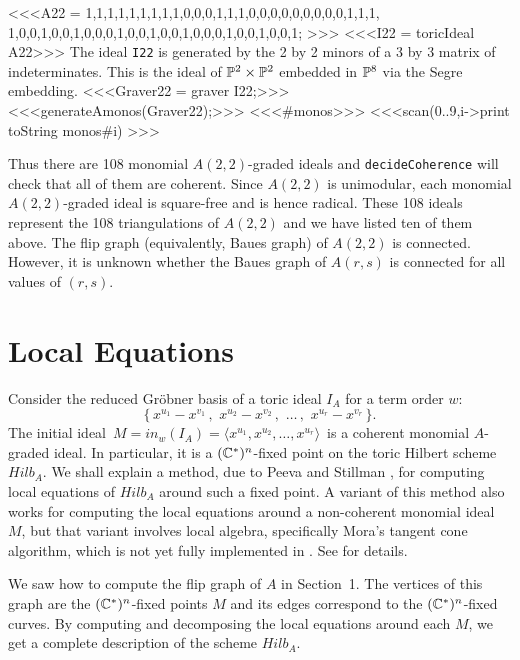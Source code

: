 <<<A22 =
  {{1,1,1,1,1,1,1,1,1},{0,0,0,1,1,1,0,0,0},{0,0,0,0,0,0,1,1,1},
  {1,0,0,1,0,0,1,0,0},{0,1,0,0,1,0,0,1,0},{0,0,1,0,0,1,0,0,1}}; >>>
<<<I22 = toricIdeal A22>>>
The ideal {\tt I22} is generated by the 2 by 2 minors of a 3 by 3
matrix of indeterminates.  This is the ideal of $\P^2 \times \P^2$
embedded in $\P^8$ via the Segre embedding.
<<<Graver22 = graver I22;>>>
<<<generateAmonos(Graver22);>>>
<<<#monos>>>
<<<scan(0..9,i->print toString monos#i) >>>

Thus there are 108 monomial $A(2,2)$-graded ideals and 
{\tt decideCoherence} will check that all of them 
are coherent. Since $A(2,2)$ is unimodular, each monomial 
$A(2,2)$-graded ideal is square-free and is hence 
radical. These 108 ideals represent the 108 triangulations of 
$A(2,2)$ and we have listed ten of them above.
The flip graph (equivalently, Baues graph) of $A(2,2)$ is connected.
However, it is unknown whether the Baues graph of $A(r,s)$ is 
connected for all values of $(r,s)$.

\section{Local Equations}
Consider the reduced Gr\"obner basis of a toric ideal $I_A$ for a
term order $w$:
\begin{equation}
\label{GrobnerBasis} \bigl\{ \,
 x^{u_1} -  x^{v_1} \, , \,\, x^{u_2} -  x^{v_2} \,, \,\, \ldots \, , \,\,
x^{u_r} -  x^{v_r}\, \bigr\} .
\end{equation}
The initial ideal $\,M = in_w(I_A) = \langle x^{u_1}, x^{u_2}, \ldots,
x^{u_r} \rangle \,$ is a coherent monomial $A$-graded ideal. In
particular, it is a $(\k^*)^n$-fixed point on the toric Hilbert scheme
$Hilb_A$.  We shall explain a method, due to Peeva and Stillman
\cite{HS:PS2}, for computing local equations of $Hilb_A$ around such a
fixed point.  A variant of this method also works for computing the
local equations around a non-coherent monomial ideal $M$, but that
variant involves local algebra, specifically Mora's tangent cone
algorithm, which is not yet fully implemented in \Mtwo. See \cite{HS:PS2}
for details.

We saw how to compute the flip graph of $A$ in Section~1. The vertices
of this graph are the $(\k^*)^n$-fixed points $M$ and its edges
correspond to the $(\k^*)^n$-fixed curves.  By computing and
decomposing the local equations around each $M$, we get a complete
description of the scheme $Hilb_A$.

